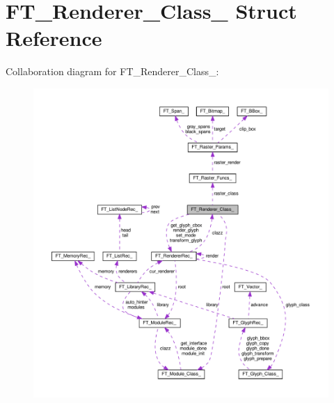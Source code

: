 \hypertarget{structFT__Renderer__Class__}{}\section{F\+T\+\_\+\+Renderer\+\_\+\+Class\+\_\+ Struct Reference}
\label{structFT__Renderer__Class__}


Collaboration diagram for F\+T\+\_\+\+Renderer\+\_\+\+Class\+\_\+\+:
\nopagebreak
\begin{figure}[H]
\begin{center}
\leavevmode
\includegraphics[width=350pt]{structFT__Renderer__Class____coll__graph}
\end{center}
\end{figure}
